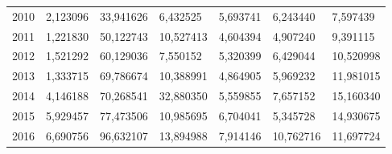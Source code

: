 \begin{table}
\begin{tabular}{p{1cm}p{2cm}p{2cm}p{2cm}p{2cm}p{2cm}p{2cm}}
 2010 &                        2,123096 &            33,941626 &  6,432525 &                   5,693741 &                       6,243440 &                            7,597439 \\
 2011 &                        1,221830 &            50,122743 & 10,527413 &                   4,604394 &                       4,907240 &                            9,391115 \\
 2012 &                        1,521292 &            60,129036 &  7,550152 &                   5,320399 &                       6,429044 &                           10,520998 \\
 2013 &                        1,333715 &            69,786674 & 10,388991 &                   4,864905 &                       5,969232 &                           11,981015 \\
 2014 &                        4,146188 &            70,268541 & 32,880350 &                   5,559855 &                       7,657152 &                           15,160340 \\
 2015 &                        5,929457 &            77,473506 & 10,985695 &                   6,704041 &                       5,345728 &                           14,930675 \\
 2016 &                        6,690756 &            96,632107 & 13,894988 &                   7,914146 &                      10,762716 &                           11,697724 \\
\bottomrule
\end{tabular}
\end{table}
